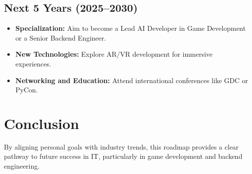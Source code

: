\documentclass{article}
\begin{document}
\subsection{Next 5 Years (2025--2030)}
\begin{itemize}
    \item \textbf{Specialization:} Aim to become a Lead AI Developer in Game Development or a Senior Backend Engineer.
    \item \textbf{New Technologies:} Explore AR/VR development for immersive experiences.
    \item \textbf{Networking and Education:} Attend international conferences like GDC or PyCon.
\end{itemize}

\section{Conclusion}
By aligning personal goals with industry trends, this roadmap provides a clear pathway to future success in IT, particularly in game development and backend engineering.
\end{document}
